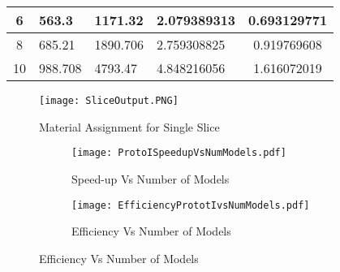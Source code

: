 \begin{table}[]
\begin{tabular}{|c|l|l|l|c|}
6                                                                                                                            & 563.3                                                                                                                                                                    & 1171.32                                                                                                                                    & 2.079389313                            & 0.693129771         \\ \hline
8                                                                                                                            & 685.21                                                                                                                                                                   & 1890.706                                                                                                                                   & 2.759308825                            & 0.919769608         \\ \hline
10                                                                                                                           & 988.708                                                                                                                                                                  & 4793.47                                                                                                                                    & 4.848216056                            & 1.616072019         \\ \hline
\end{tabular}
\end{table}

\begin{figure}[t]
\centering
\texttt{[image: SliceOutput.PNG]}
\caption{Material Assignment for Single Slice}
\label{fig:SliceOutput}
\end{figure}

\begin{figure}
\centering

\begin{subfigure}
\centering
\captionsetup[subfigure]{labelformat=empty}
\texttt{[image: ProtoISpeedupVsNumModels.pdf]}
\caption{Speed-up Vs Number of Models}
\label{fig:ProtoISpeedupVsNumModels}
\end{subfigure}
\begin{subfigure}
\centering
\texttt{[image: EfficiencyPrototIvsNumModels.pdf]}
\caption{Efficiency Vs Number of Models}
\label{fig:EfficiencyVsNumModels}
\end{subfigure}
\end{figure}


